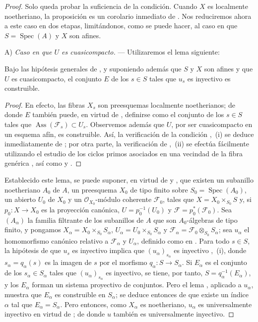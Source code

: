 \begin{proof}
Solo queda probar la suficiencia de la condición.
Cuando $X$ es localmente noetheriano, la proposición es un corolario inmediato de .
Nos reduciremos ahora a este caso en dos etapas, limitándonos, como se puede hacer, al caso en que $S=\operatorname{Spec}(A)$ y $X$ son afines.
\medskip

A) \emph{Caso en que $U$ es cuasicompacto.} --- Utilizaremos el lema siguiente:

\begin{lemma}[11.9.17.1]
\label{IV.11.9.17.1}
Bajo las hipótesis generales de , y suponiendo además que $S$ y $X$ son afines y que $U$ es cuasicompacto, el conjunto $E$ de los $s\in S$ tales que $u_s$ es inyectivo es construible.
\end{lemma}

\begin{proof}
En efecto, las fibras $X_s$ son preesquemas localmente noetherianos; de donde $E$ también puede, en virtud de , definirse como el conjunto de los $s\in S$ tales que $\operatorname{Ass}(\mathcal F_s)\subset U_s$.
Observemos además que $U$, por ser cuasicompacto en un esquema afín, es construible. Así, la verificación de la condición ,~(i) se deduce inmediatamente de ; por otra parte, la
verificación de ,~(ii) se efectúa fácilmente utilizando el estudio de los ciclos primos asociados en una vecindad de la fibra genérica , así como  y .
\end{proof}

Establecido este lema, se puede suponer, en virtud de  y , que existen un subanillo noetheriano $A_0$ de $A$, un preesquema $X_0$ de tipo finito sobre $S_0=\operatorname{Spec}(A_0)$, un abierto $U_0$ de $X_0$ y un $\mathcal O_{X_0}$-módulo coherente $\mathcal F_0$, tales que $X=X_0\times_{S_0}S$ y, si $p_0:X\to X_0$ es la proyección canónica, $U=p_0^{-1}(U_0)$ y $\mathcal F=p_0^*(\mathcal F_0)$.
Sea $(A_\alpha)$ la familia filtrante de los subanillos de $A$ que son $A_0$-álgebras de tipo finito, y pongamos $X_\alpha=X_0\times_{S_0}S_\alpha$, $U_\alpha=U_0\times_{S_0}S_\alpha$ y $\mathcal F_\alpha=\mathcal F_0\otimes_{S_0}S_\alpha$; sea $u_\alpha$ el homomorfismo canónico relativo a $\mathcal F_\alpha$ y $U_\alpha$, definido como en .
Para todo $s\in S$, la hipótesis de que $u_s$ es inyectivo implica que $(u_\alpha)_{s_\alpha}$ es inyectivo ,~(i), donde $s_\alpha=q_\alpha(s)$ es la imagen de $s$ por el morfismo $q_\alpha:S\to S_\alpha$.
Si $E_\alpha$ es el conjunto de los $s_\alpha\in S_\alpha$ tales que $(u_\alpha)_{s_\alpha}$ es inyectivo, se tiene, por tanto, $S=q_\alpha^{-1}(E_\alpha)$, y los $E_\alpha$ forman un sistema proyectivo de conjuntos.
Pero el lema , aplicado a $u_\alpha$, muestra que $E_\alpha$ es construible en $S_\alpha$; se deduce entonces de  que existe un índice $\alpha$ tal que $E_\alpha=S_\alpha$.
Pero entonces, como $X_\alpha$ es noetheriano, $u_\alpha$ es universalmente inyectivo en virtud de ; de donde $u$ también es universalmente inyectivo.
\medskip


\end{proof}
